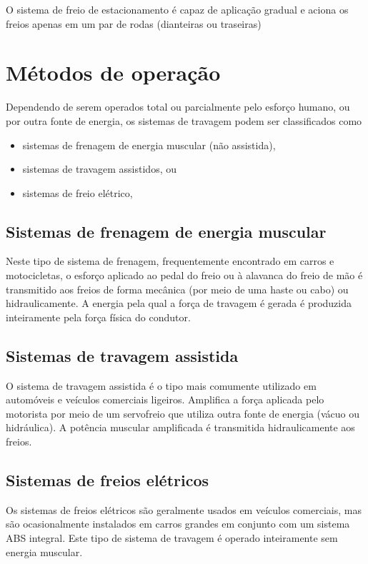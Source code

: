 O sistema de freio de estacionamento é capaz de aplicação gradual e aciona os freios apenas em um par de rodas (dianteiras ou traseiras)


\section{Métodos de operação}

Dependendo de serem operados total ou parcialmente pelo esforço humano, ou por outra fonte de energia, os sistemas de travagem podem ser classificados como

\begin{itemize}
    \item sistemas de frenagem de energia muscular (não assistida),
    \item sistemas de travagem assistidos, ou
    \item sistemas de freio elétrico,
\end{itemize}

\subsection{Sistemas de frenagem de energia muscular }

Neste tipo de sistema de frenagem, frequentemente encontrado em carros e motocicletas, o esforço aplicado ao pedal do freio ou à alavanca do freio de mão é transmitido aos freios de forma mecânica (por meio de uma haste ou cabo) ou hidraulicamente. A energia pela qual a força de travagem é gerada é produzida inteiramente pela força física do condutor.

\subsection{Sistemas de travagem assistida }

O sistema de travagem assistida é o tipo mais comumente utilizado em automóveis e veículos comerciais ligeiros. Amplifica a força aplicada pelo motorista por meio de um servofreio que utiliza outra fonte de energia (vácuo ou hidráulica). A potência muscular amplificada é transmitida hidraulicamente aos freios.

\subsection{Sistemas de freios elétricos }

Os sistemas de freios elétricos são geralmente usados em veículos comerciais, mas são ocasionalmente instalados em carros grandes em conjunto com um sistema ABS integral. Este tipo de sistema de travagem é operado inteiramente sem energia muscular.

